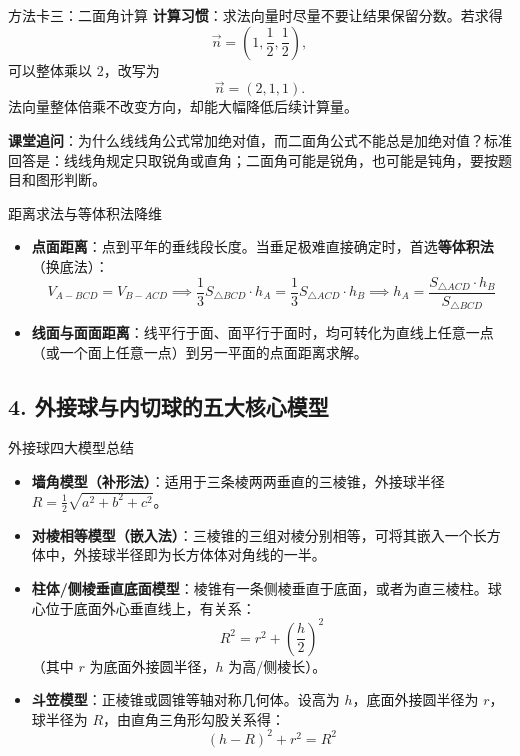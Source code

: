 \documentclass[11pt,a4paper]{ctexart}
\begin{document}
\begin{teachbox}{方法卡三：二面角计算}
\textbf{计算习惯}：求法向量时尽量不要让结果保留分数。若求得
\[
  \vec{n}=\left(1,\frac12,\frac12\right),
\]
可以整体乘以 $2$，改写为
\[
  \vec{n}=(2,1,1).
\]
法向量整体倍乘不改变方向，却能大幅降低后续计算量。

\textbf{课堂追问}：为什么线线角公式常加绝对值，而二面角公式不能总是加绝对值？标准回答是：线线角规定只取锐角或直角；二面角可能是锐角，也可能是钝角，要按题目和图形判断。
\end{teachbox}

\begin{teachbox}{距离求法与等体积法降维}
\begin{itemize}
  \item \textbf{点面距离}：点到平年的垂线段长度。当垂足极难直接确定时，首选\textbf{等体积法}（换底法）：
    \[ V_{A-BCD} = V_{B-ACD} \implies \frac{1}{3} S_{\triangle BCD} \cdot h_A = \frac{1}{3} S_{\triangle ACD} \cdot h_B \implies h_A = \frac{S_{\triangle ACD} \cdot h_B}{S_{\triangle BCD}} \]
  \item \textbf{线面与面面距离}：线平行于面、面平行于面时，均可转化为直线上任意一点（或一个面上任意一点）到另一平面的点面距离求解。
\end{itemize}
\end{teachbox}

\subsection*{4. 外接球与内切球的五大核心模型}

\begin{teachbox}{外接球四大模型总结}
\begin{itemize}
  \item \textbf{墙角模型（补形法）}：适用于三条棱两两垂直的三棱锥，外接球半径 $R = \frac{1}{2}\sqrt{a^2 + b^2 + c^2}$。
  \item \textbf{对棱相等模型（嵌入法）}：三棱锥的三组对棱分别相等，可将其嵌入一个长方体中，外接球半径即为长方体体对角线的一半。
  \item \textbf{柱体/侧棱垂直底面模型}：棱锥有一条侧棱垂直于底面，或者为直三棱柱。球心位于底面外心垂直线上，有关系：
    \[ R^2 = r^2 + \left(\frac{h}{2}\right)^2 \]
    （其中 $r$ 为底面外接圆半径，$h$ 为高/侧棱长）。
  \item \textbf{斗笠模型}：正棱锥或圆锥等轴对称几何体。设高为 $h$，底面外接圆半径为 $r$，球半径为 $R$，由直角三角形勾股关系得：
    \[ (h - R)^2 + r^2 = R^2 \]
\end{itemize}
\end{teachbox}
\end{document}
